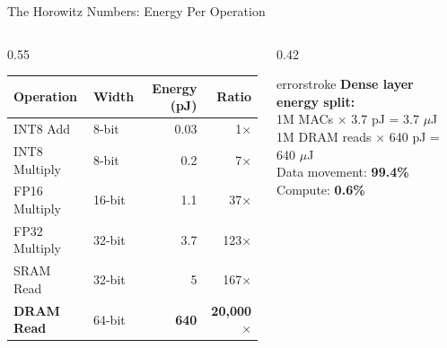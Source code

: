 \documentclass[aspectratio=169, 12pt]{beamer}
\begin{document}
\begin{frame}{The Horowitz Numbers: Energy Per Operation}
\begin{columns}[T]
\begin{column}{0.55\textwidth}
    \vspace{0.1cm}
    \renewcommand{\arraystretch}{1.05}
    {\scriptsize
    \begin{tabular}{@{}llrr@{}}
      \toprule
      \textbf{Operation} & \textbf{Width} & \textbf{Energy (pJ)} & \textbf{Ratio} \\
      \midrule
      INT8 Add      & 8-bit   & 0.03    & 1$\times$ \\
      INT8 Multiply & 8-bit   & 0.2     & 7$\times$ \\
      FP16 Multiply & 16-bit  & 1.1     & 37$\times$ \\
      FP32 Multiply & 32-bit  & 3.7     & 123$\times$ \\
      SRAM Read     & 32-bit  & 5       & 167$\times$ \\
      \textcolor{errorstroke}{\textbf{DRAM Read}} & 64-bit & \textcolor{errorstroke}{\textbf{640}} & \textcolor{errorstroke}{\textbf{20,000$\times$}} \\
      \bottomrule
    \end{tabular}
    }
  \end{column}
  \begin{column}{0.42\textwidth}
    \vspace{0.1cm}
    \begin{mlsyscard}{errorstroke}
    {\scriptsize \textbf{Dense layer energy split:}\\[0.05cm]
    1M MACs $\times$ 3.7 pJ = 3.7 $\mu$J\\
    1M DRAM reads $\times$ 640 pJ = 640 $\mu$J\\[0.05cm]
    Data movement: \textbf{99.4\%}\\
    Compute: \textbf{0.6\%}}
    \end{mlsyscard}

    \vspace{0.1cm}
  \end{column}
\end{columns}

\end{frame}
\end{document}
